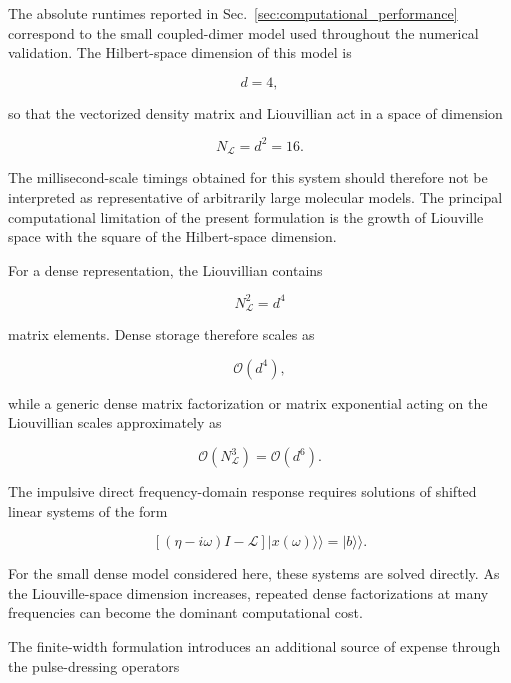 \documentclass[11pt]{article}
\begin{document}
The absolute runtimes reported in Sec.~\ref{sec:computational_performance}
correspond to the small coupled-dimer model used throughout the
numerical validation.  The Hilbert-space dimension of this model is

\begin{equation}
d=4,
\end{equation}

so that the vectorized density matrix and Liouvillian act in a space
of dimension

\begin{equation}
\boxed{
N_{\mathcal{L}}
=
d^2
=
16.
}
\end{equation}

The millisecond-scale timings obtained for this system should therefore
not be interpreted as representative of arbitrarily large molecular
models.  The principal computational limitation of the present
formulation is the growth of Liouville space with the square of the
Hilbert-space dimension.

For a dense representation, the Liouvillian contains

\begin{equation}
N_{\mathcal{L}}^2
=
d^4
\end{equation}

matrix elements.  Dense storage therefore scales as

\begin{equation}
\mathcal{O}(d^4),
\end{equation}

while a generic dense matrix factorization or matrix exponential acting
on the Liouvillian scales approximately as

\begin{equation}
\mathcal{O}(N_{\mathcal{L}}^3)
=
\mathcal{O}(d^6).
\end{equation}

The impulsive direct frequency-domain response requires solutions of
shifted linear systems of the form

\begin{equation}
\left[
(\eta-i\omega)I-\mathcal{L}
\right]
|x(\omega)\rangle\rangle
=
|b\rangle\rangle.
\end{equation}

For the small dense model considered here, these systems are solved
directly.  As the Liouville-space dimension increases, repeated dense
factorizations at many frequencies can become the dominant
computational cost.

The finite-width formulation introduces an additional source of
expense through the pulse-dressing operators
\end{document}
